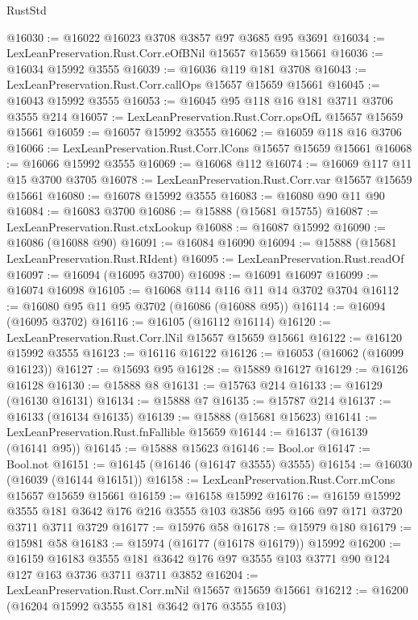 \begin{lexlean}{RustStd}
\begin{coremodule}
@16030 := @16022 @16023 @3708 @3857 @97 @3685 @95 @3691
@16034 := LexLeanPreservation.Rust.Corr.eOfBNil @15657 @15659 @15661
@16036 := @16034 @15992 @3555
@16039 := @16036 @119 @181 @3708
@16043 := LexLeanPreservation.Rust.Corr.callOps @15657 @15659 @15661
@16045 := @16043 @15992 @3555
@16053 := @16045 @95 @118 @16 @181 @3711 @3706 @3555 @214
@16057 := LexLeanPreservation.Rust.Corr.opsOfL @15657 @15659 @15661
@16059 := @16057 @15992 @3555
@16062 := @16059 @118 @16 @3706
@16066 := LexLeanPreservation.Rust.Corr.lCons @15657 @15659 @15661
@16068 := @16066 @15992 @3555
@16069 := @16068 @112
@16074 := @16069 @117 @11 @15 @3700 @3705
@16078 := LexLeanPreservation.Rust.Corr.var @15657 @15659 @15661
@16080 := @16078 @15992 @3555
@16083 := @16080 @90 @11 @90
@16084 := @16083 @3700
@16086 := @15888 (@15681 @15755)
@16087 := LexLeanPreservation.Rust.ctxLookup
@16088 := @16087 @15992
@16090 := @16086 (@16088 @90)
@16091 := @16084 @16090
@16094 := @15888 (@15681 LexLeanPreservation.Rust.RIdent)
@16095 := LexLeanPreservation.Rust.readOf
@16097 := @16094 (@16095 @3700)
@16098 := @16091 @16097
@16099 := @16074 @16098
@16105 := @16068 @114 @116 @11 @14 @3702 @3704
@16112 := @16080 @95 @11 @95 @3702 (@16086 (@16088 @95))
@16114 := @16094 (@16095 @3702)
@16116 := @16105 (@16112 @16114)
@16120 := LexLeanPreservation.Rust.Corr.lNil @15657 @15659 @15661
@16122 := @16120 @15992 @3555
@16123 := @16116 @16122
@16126 := @16053 (@16062 (@16099 @16123))
@16127 := @15693 @95
@16128 := @15889 @16127
@16129 := @16126 @16128
@16130 := @15888 @8
@16131 := @15763 @214
@16133 := @16129 (@16130 @16131)
@16134 := @15888 @7
@16135 := @15787 @214
@16137 := @16133 (@16134 @16135)
@16139 := @15888 (@15681 @15623)
@16141 := LexLeanPreservation.Rust.fnFallible @15659
@16144 := @16137 (@16139 (@16141 @95))
@16145 := @15888 @15623
@16146 := Bool.or
@16147 := Bool.not
@16151 := @16145 (@16146 (@16147 @3555) @3555)
@16154 := @16030 (@16039 (@16144 @16151))
@16158 := LexLeanPreservation.Rust.Corr.mCons @15657 @15659 @15661
@16159 := @16158 @15992
@16176 := @16159
    @15992
    @3555
    @181
    @3642
    @176
    @216
    @3555
    @103
    @3856
    @95
    @166
    @97
    @171
    @3720
    @3711
    @3711
    @3729
@16177 := @15976 @58
@16178 := @15979 @180
@16179 := @15981 @58
@16183 := @15974 (@16177 (@16178 @16179)) @15992
@16200 := @16159
    @16183
    @3555
    @181
    @3642
    @176
    @97
    @3555
    @103
    @3771
    @90
    @124
    @127
    @163
    @3736
    @3711
    @3711
    @3852
@16204 := LexLeanPreservation.Rust.Corr.mNil @15657 @15659 @15661
@16212 := @16200 (@16204 @15992 @3555 @181 @3642 @176 @3555 @103)

\end{coremodule}
\end{lexlean}
